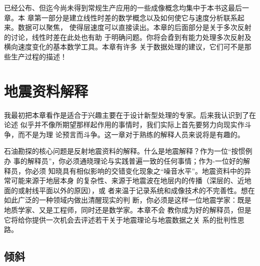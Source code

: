已经公布、但迄今尚未得到常规生产应用的一些成像概念均集中于本书这最后一章。本
章第一部分是建立线性时差的数学概念以及如何使它与速度分析联系起来。数据可以聚焦，
使得层速度可以直接读出。本章的后面部分是关于多次反射的讨论，线性时差在此处也有助
于明确问题。你将会孴到有能力处理多次反射及横向速度变化的基本数学工具。本章有许多
关于数据处理的建议，它们可不是那些生产过程的描述！

\section{地震资料解释}
\label{sec:5.0.1}

我最初把本章看作是适合于兴趣主要在于设计新型处理的专家。后来我认识到了在论述
似乎并不像所期望那样起作用的事情时，我们实际上首先要努力向现实作斗争，而不是为理
论预言而斗争。这一章对于熟练的解释人员来说将是有趣的。

石油勘探的核心问题是反射地震资料的解释。什么是地震解释？作为一位“按惯例办
事的解释员”，你必须通晓理论与实践普遍一致的任何事情；作为-一位好的解释员，你必须
知晓具有相似影响的交错变化现象之“噪音水平”。地震资料中的异常可能来源于地层本身
的复杂性、来源于地震波在地层内的传播（深层的、近地面的或射线平面以外的原因），或
者来温于记录系统和成像技术的不完善性。想在如此广泛的一种领域内做出清醒现实的判
断，你必须是这样一位地震学家：既是地质学家、又是工程师，同时还是数学家。本章不会
教你成为好的解释员，但是它将给你提供一次机会去评述若干关于地震理论与地震数据之关
系的批判性思路。

\subsection{倾斜}
\label{sec:5.0.2}




